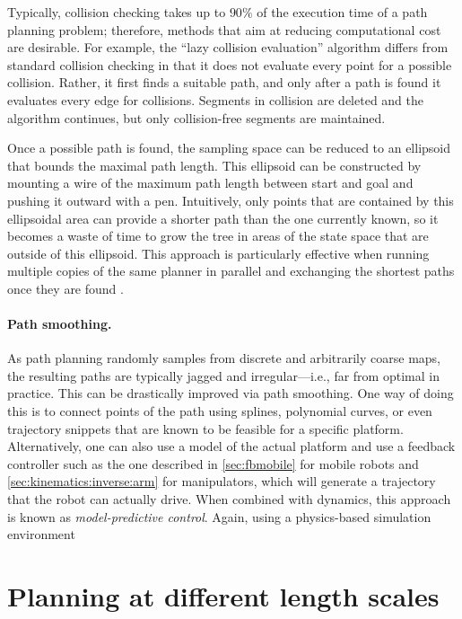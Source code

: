 Typically, collision checking takes up to $90\%$ of the execution time of a path planning problem; therefore, methods that aim at reducing computational cost are desirable. For example, the ``lazy collision evaluation'' algorithm differs from standard collision checking in that it does not evaluate every point for a possible collision. Rather, it first finds a suitable path, and only after a path is found it evaluates every edge for collisions. Segments in collision are deleted and the algorithm continues, but only collision-free segments are maintained.

Once a possible path is found, the sampling space can be reduced to an ellipsoid that bounds the maximal path length. This ellipsoid can be constructed by mounting a wire of the maximum path length between start and goal and pushing it outward with a pen. Intuitively, only points that are contained by this ellipsoidal area can provide a shorter path than the one currently known, so it becomes a waste of time to grow the tree in areas of the state space that are outside of this ellipsoid. This approach is particularly effective when running multiple copies of the same planner in parallel and exchanging the shortest paths once they are found \cite{otte2012}.

\paragraph{Path smoothing.}

As path planning randomly samples from discrete and arbitrarily coarse maps, the resulting paths are typically jagged and irregular---i.e., far from optimal in practice. This can be drastically improved via path smoothing. One way of doing this is to connect points of the path using splines, polynomial curves, or even trajectory snippets that are known to be feasible for a specific platform. Alternatively, one can also use a model of the actual platform and use a feedback controller such as the one described in \cref{sec:fbmobile} for mobile robots and \cref{sec:kinematics:inverse:arm} for manipulators, which will generate a trajectory that the robot can actually drive.
When combined with dynamics, this approach is known as \textsl{model-predictive control}. Again, using a physics-based simulation environment

\section{Planning at different length scales}

